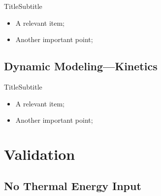     \begin{frame}{Title}{Subtitle}\vspace*{-2em}
        \begin{itemize}
            \item<2->  A \alert{relevant} item;
            \item<3->  Another \alert{important} point;
        \end{itemize}
    \end{frame}

\subsection{Dynamic Modeling---Kinetics}

    \begin{frame}{Title}{Subtitle}\vspace*{-2em}
        \begin{itemize}
            \item<2->  A \alert{relevant} item;
            \item<3->  Another \alert{important} point;
        \end{itemize}
    \end{frame}

\section{Validation}

\subsection{No Thermal Energy Input}


